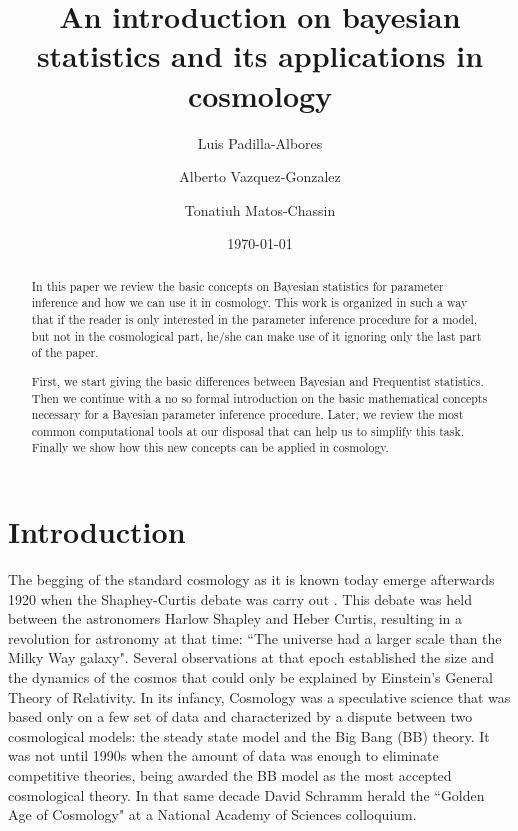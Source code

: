 \documentclass[onecolumn,           %
               showpacs,            %
               preprintnumbers,     %
               aps,                 %
               prl,          	    %
               letterpaper,             %
               superscriptaddress,      %
               nofootinbib,         %
               tightenlines,        %
               floats,floatfix      %
               ,usenatbib,
               ]{revtex4-1}
\begin{document}
\title{An introduction on bayesian statistics and its applications in cosmology}
\author{Luis Padilla-Albores}  
   \author{Alberto Vazquez-Gonzalez}  
  \author{Tonatiuh Matos-Chassin}  
\date{\today}

\begin{abstract}

In this paper we review the basic concepts on Bayesian statistics for parameter inference and how we can use it in cosmology. This work is organized in such a way that if the reader is only interested in the parameter inference procedure for a model, but not in the cosmological part, he/she can make use of it ignoring only the last part of the paper. 

First, we start giving the basic differences between Bayesian and Frequentist statistics. Then we continue with a no so formal introduction on the basic mathematical concepts necessary for a Bayesian parameter inference procedure. Later, we review the most common computational tools at our disposal that can help us to simplify this task. Finally we show how this new concepts can be applied in cosmology.     
\end{abstract}

\maketitle

\section{Introduction}

The begging of the standard cosmology as it is known today emerge afterwards 1920 when the Shaphey-Curtis debate was carry out \cite{debate}. This debate was held between the astronomers Harlow Shapley and Heber Curtis, resulting in a revolution for astronomy at that time: ``The universe had a larger scale than the Milky Way galaxy". Several observations at that epoch established the size and the dynamics of the cosmos that could only be explained by Einstein's General Theory of Relativity. In its infancy, Cosmology was a speculative science that was based only on a few set of data and characterized by a dispute between two cosmological models: the steady state model and the Big Bang (BB) theory. It was not until 1990s when the amount of data was enough to eliminate competitive theories, being awarded the BB model as the most accepted cosmological theory. In that same decade David Schramm herald the ``Golden Age of Cosmology" at a National Academy of Sciences colloquium.    
\end{document}
